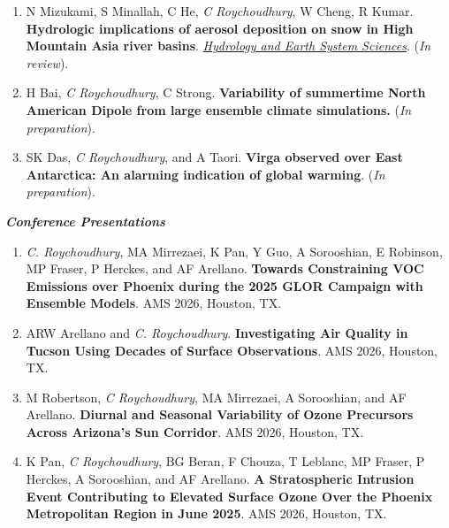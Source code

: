 \documentclass[margin,line]{resume}
\begin{document}
\begin{resume}
\begin{enumerate}[topsep=1pt, partopsep=1pt, itemsep=0.5pt, parsep=0.1pt, leftmargin=15pt,label=\arabic*.]
			\item N Mizukami, S Minallah, C He, \textit{C Roychoudhury}, W Cheng, R Kumar. \textbf{Hydrologic implications of aerosol deposition on snow in High
			Mountain Asia river basins}. \textit{\href{https://egusphere.copernicus.org/preprints/2025/egusphere-2025-4586/}{Hydrology and Earth System Sciences}}. (\textit{In review}).
			
			
			\item H Bai, \textit{C Roychoudhury}, C Strong. \textbf{Variability of summertime North American Dipole from large ensemble climate simulations.} (\emph{In preparation}).
			
			\item SK Das, \textit{C Roychoudhury}, and A Taori.
			\textbf{Virga observed over East Antarctica: An alarming indication of global warming}. (\emph{In preparation}).
			
			
		\end{enumerate}
		
	
	\textbf{\emph{\textcolor{sep}{Conference Presentations}}}
		\begin{enumerate}[topsep=1pt, partopsep=1pt, itemsep=0.5pt, parsep=0.1pt, leftmargin=15pt,label=\arabic*.]
			
			\item \textit{C. Roychoudhury}, MA Mirrezaei, K Pan, Y Guo, A Sorooshian, E Robinson, MP Fraser, P Herckes, and AF Arellano. \textbf{Towards Constraining VOC Emissions over Phoenix during the 2025 GLOR Campaign with Ensemble Models}. AMS 2026, Houston, TX.
			
			\item ARW Arellano and \textit{C. Roychoudhury}. \textbf{Investigating Air Quality in Tucson Using Decades of Surface Observations}. AMS 2026, Houston, TX.
			
			\item M Robertson, \textit{C Roychoudhury}, MA Mirrezaei, A Sorooshian, and AF Arellano. \textbf{Diurnal and Seasonal Variability of Ozone Precursors Across Arizona's Sun Corridor}. AMS 2026, Houston, TX.
			
			\item K Pan,\textit{ C Roychoudhury}, BG Beran, F Chouza, T Leblanc, MP Fraser, P Herckes, A Sorooshian, and AF Arellano. \textbf{A Stratospheric Intrusion Event Contributing to Elevated Surface Ozone Over the Phoenix Metropolitan Region in June 2025}. AMS 2026, Houston, TX.
			

\end{enumerate}
\end{resume}
\end{document}
